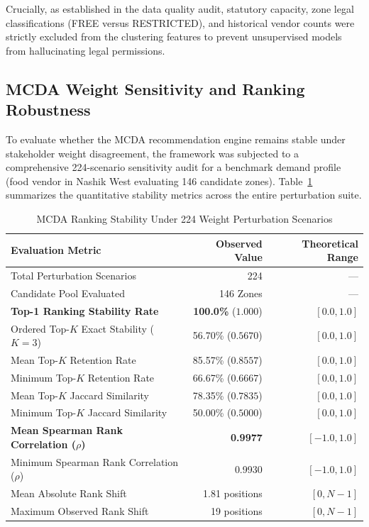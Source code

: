 Crucially, as established in the data quality audit, statutory capacity, zone legal classifications (FREE versus RESTRICTED), and historical vendor counts were strictly excluded from the clustering features to prevent unsupervised models from hallucinating legal permissions.

\subsection{MCDA Weight Sensitivity and Ranking Robustness}
\label{sec:res_sensitivity}

To evaluate whether the MCDA recommendation engine remains stable under stakeholder weight disagreement, the framework was subjected to a comprehensive 224-scenario sensitivity audit for a benchmark demand profile (food vendor in Nashik West evaluating 146 candidate zones). Table~\ref{tab:sensitivity_results} summarizes the quantitative stability metrics across the entire perturbation suite.

\begin{table}[t]
    \caption{MCDA Ranking Stability Under 224 Weight Perturbation Scenarios}
    \label{tab:sensitivity_results}
    \centering
    \begin{tabular}{lrr}
        \toprule
        \textbf{Evaluation Metric} & \textbf{Observed Value} & \textbf{Theoretical Range} \\
        \midrule
        Total Perturbation Scenarios & 224 & --- \\
        Candidate Pool Evaluated & 146 Zones & --- \\
        \midrule
        \textbf{Top-1 Ranking Stability Rate} & \textbf{100.0\%} ($1.000$) & $[0.0, 1.0]$ \\
        Ordered Top-$K$ Exact Stability ($K=3$) & 56.70\% ($0.5670$) & $[0.0, 1.0]$ \\
        Mean Top-$K$ Retention Rate & 85.57\% ($0.8557$) & $[0.0, 1.0]$ \\
        Minimum Top-$K$ Retention Rate & 66.67\% ($0.6667$) & $[0.0, 1.0]$ \\
        Mean Top-$K$ Jaccard Similarity & 78.35\% ($0.7835$) & $[0.0, 1.0]$ \\
        Minimum Top-$K$ Jaccard Similarity & 50.00\% ($0.5000$) & $[0.0, 1.0]$ \\
        \midrule
        \textbf{Mean Spearman Rank Correlation ($\rho$)} & \textbf{0.9977} & $[-1.0, 1.0]$ \\
        Minimum Spearman Rank Correlation ($\rho$) & 0.9930 & $[-1.0, 1.0]$ \\
        Mean Absolute Rank Shift & 1.81 positions & $[0, N-1]$ \\
        Maximum Observed Rank Shift & 19 positions & $[0, N-1]$ \\
        \bottomrule
    \end{tabular}
\end{table}

